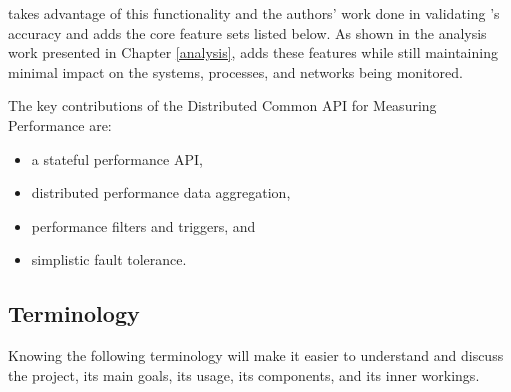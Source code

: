 \dcamp takes advantage of this functionality and the authors' work done in validating \campns's accuracy and adds the
core feature sets listed below. As shown in the analysis work presented in Chapter \ref{analysis}, \dcamp adds these
features while still maintaining minimal impact on the systems, processes, and networks being monitored.

The key contributions of the Distributed Common API for Measuring Performance are:

\begin{itemize}
\item a stateful performance API,
\item distributed performance data aggregation,
\item performance filters and triggers, and
\item simplistic fault tolerance.
\end{itemize}

\subsection{Terminology}
Knowing the following terminology will make it easier to understand and discuss the \dcamp project, its main goals, its
usage, its components, and its inner workings. 

